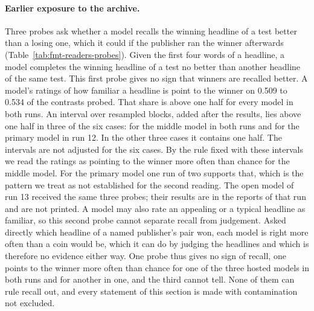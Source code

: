 \paragraph{Earlier exposure to the archive.} Three probes ask whether a model recalls the winning headline of a test better than a losing one, which it could if the publisher ran the winner afterwards (Table~\ref{tab:fmt-readers-probes}). Given the first four words of a headline, a model completes the winning headline of a test no better than another headline of the same test. This first probe gives no sign that winners are recalled better. A model's ratings of how familiar a headline is point to the winner on 0.509 to 0.534 of the contrasts probed. That share is above one half for every model in both runs. An interval over resampled blocks, added after the results, lies above one half in three of the six cases: for the middle model in both runs and for the primary model in run 12. In the other three cases it contains one half. The intervals are not adjusted for the six cases. By the rule fixed with these intervals we read the ratings as pointing to the winner more often than chance for the middle model. For the primary model one run of two supports that, which is the pattern we treat as not established for the second reading. The open model of run 13 received the same three probes; their results are in the reports of that run and are not printed. A model may also rate an appealing or a typical headline as familiar, so this second probe cannot separate recall from judgement. Asked directly which headline of a named publisher's pair won, each model is right more often than a coin would be, which it can do by judging the headlines and which is therefore no evidence either way. One probe thus gives no sign of recall, one points to the winner more often than chance for one of the three hosted models in both runs and for another in one, and the third cannot tell. None of them can rule recall out, and every statement of this section is made with contamination not excluded.

